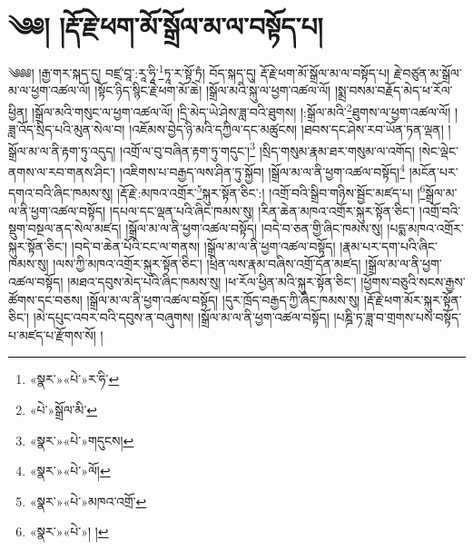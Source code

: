 \chapter{༄༅། །རྡོ་རྗེ་ཕག་མོ་སྒྲོལ་མ་ལ་བསྟོད་པ།}༄༅༅། །རྒྱ་གར་སྐད་དུ། བཛྲ་བཱ་:རཱ་ཧཱི་\footnote{«སྣར་»«པེ་»ར་ཧི་}ཏཱ་ར་སྟོ་ཏྲཾ། བོད་སྐད་དུ། རྡོ་རྗེ་ཕག་མོ་སྒྲོལ་མ་ལ་བསྟོད་པ། རྗེ་བཙུན་མ་སྒྲོལ་མ་ལ་ཕྱག་འཚལ་ལོ། །སྟོང་ཉིད་སྙིང་རྗེ་ཕག་མོ་ཆེ། །སྒྲོལ་མའི་སྐུ་ལ་ཕྱག་འཚལ་ལོ། །སྨྲ་བསམ་བརྗོད་མེད་ཕ་རོལ་ཕྱིན། །སྒྲོལ་མའི་གསུང་ལ་ཕྱག་འཚལ་ལོ། །དྲི་མེད་ཡེ་ཤེས་ཟླ་བའི་ཐུགས། །:སྒྲོལ་མའི་\footnote{«པེ་»སྒྲོལ་མི་}ཐུགས་ལ་ཕྱག་འཚལ་ལོ། །ཟླ་འོད་སྲིད་པའི་མུན་སེལ་བ། །འཇོམས་བྱེད་ཉི་མའི་དཀྱིལ་དང་མཚུངས། །ཐབས་དང་ཤེས་རབ་ཡོན་ཏན་ལྡན། །སྒྲོལ་མ་ལ་ནི་རྟག་ཏུ་འདུད། །འགྲོ་ལ་བུ་བཞིན་རྟག་ཏུ་གདུང་།\footnote{«སྣར་»«པེ་»གདུངས།} །སྲིད་གསུམ་རྣམ་ཐར་གསུམ་ལ་འགོད། །སེང་ལྡེང་ནགས་ལ་རབ་གནས་ཤིང་། །འཇིགས་པ་བརྒྱད་ལས་ཤིན་ཏུ་སྐྱོབ། །སྒྲོལ་མ་ལ་ནི་ཕྱག་འཚལ་བསྟོད།\footnote{«སྣར་»«པེ་»ལོ།} །མངོན་པར་དགའ་བའི་ཞིང་ཁམས་སུ། །རྡོ་རྗེ་:མཁའ་འགྲོར་\footnote{«སྣར་»«པེ་»མཁའ་འགྲོ་}སྐུར་སྟོན་ཅིང་:། །འགྲོ་བའི་སྒྲིབ་གཉིས་སྦྱོང་མཛད་པ། །\footnote{«སྣར་»«པེ་»། །}སྒྲོལ་མ་ལ་ནི་ཕྱག་འཚལ་བསྟོད། །དཔལ་དང་ལྡན་པའི་ཞིང་ཁམས་སུ། །རིན་ཆེན་མཁའ་འགྲོར་སྐུར་སྟོན་ཅིང་། །འགྲོ་བའི་སྡུག་བསྔལ་ནད་སེལ་མཛད། །སྒྲོལ་མ་ལ་ནི་ཕྱག་འཚལ་བསྟོད། །བདེ་བ་ཅན་གྱི་ཞིང་ཁམས་སུ། །པདྨ་མཁའ་འགྲོར་སྐུར་སྟོན་ཅིང་། །བདེ་བ་ཆེན་པོའི་ངང་ལ་གནས། །སྒྲོལ་མ་ལ་ནི་ཕྱག་འཚལ་བསྟོད། །རྣམ་པར་དག་པའི་ཞིང་ཁམས་སུ། །ལས་ཀྱི་མཁའ་འགྲོར་སྐུར་སྟོན་ཅིང་། །ཕྲིན་ལས་རྣམ་བཞིས་འགྲོ་དོན་མཛད། །སྒྲོལ་མ་ལ་ནི་ཕྱག་འཚལ་བསྟོད། །མཐའ་དབུས་མེད་པའི་ཞིང་ཁམས་སུ། །ཕ་རོལ་ཕྱིན་མའི་སྐུར་སྟོན་ཅིང་། །ཕྱོགས་བཅུའི་སངས་རྒྱས་ཚོགས་དང་བཅས། །སྒྲོལ་མ་ལ་ནི་ཕྱག་འཚལ་བསྟོད། །དུར་ཁྲོད་བརྒྱད་ཀྱི་ཞིང་ཁམས་སུ། །རྡོ་རྗེ་ཕག་མོར་སྐུར་སྟོན་ཅིང་། །མེ་དཔུང་འབར་བའི་དབུས་ན་བཞུགས། །སྒྲོལ་མ་ལ་ནི་ཕྱག་འཚལ་བསྟོད། །པཎྜི་ཏ་ཟླ་བ་གྲགས་པས་བསྟོད་པ་མཛད་པ་རྫོགས་སོ། ། 